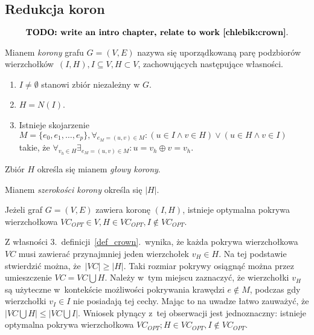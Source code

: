 \subsection{Redukcja koron}\label{ss_kernelization_crown_reduction}
\par{
  \[\textbf{TODO: write an intro chapter, relate to work~\cite{chlebik:crown}}.\]
}
\begin{definition}
  Mianem \emph{korony} grafu $G=(V, E)$ nazywa się uporządkowaną parę
  podzbiorów wierzchołków $(I, H), I \subseteq V, H \subset V$, zachowujących
  następujące własności.
  \begin{enumerate}
    \item $I \neq \emptyset$ stanowi zbiór niezależny w $G$.
    \item $H=N(I)$.
    \item Istnieje skojarzenie $M=\{e_0, e_1, \ldots, e_p\}, \forall_{e_M=(u,v) \in
      M}: (u\in I \land v\in H) \lor (u \in H \land v \in I)$ takie, że
      $\forall_{v_h \in H}\exists_{e_M=(u,v)\in M}: u = v_h \oplus v = v_h$.
  \end{enumerate}
\end{definition}
\begin{definition}
  Zbiór $H$ określa się mianem \emph{głowy korony}.
\end{definition}
\begin{definition}
  Mianem \emph{szerokości korony} określa się $|H|$.
\end{definition}
\begin{theorem}
  Jeżeli graf $G=(V,E)$ zawiera koronę $(I,H)$, istnieje optymalna pokrywa 
  wierzchołkowa $VC_{OPT} \in V, H \in VC_{OPT}, I \notin VC_{OPT}$.
\end{theorem}
\begin{bproof}
  Z własności 3.\ definicji~\ref{def_crown}.\ wynika, że każda pokrywa 
  wierzchołkowa $VC$ musi zawierać przynajmniej jeden wierzchołek $v_H \in H$.
  Na tej podstawie stwierdzić można, że $|VC|\geq|H|$.
  Taki rozmiar pokrywy osiągnąć można przez umieszczenie $VC=VC\bigcup H$.
  Należy w~tym miejscu zaznaczyć, że wierzchołki $v_H$ są użyteczne w~kontekście
  możliwości pokrywania krawędzi $e \notin M$, podczas gdy wierzchołki $v_I \in
  I$ nie posiadają tej cechy.
  Mając to na uwadze łatwo zauważyć, że $|VC \bigcup H| \leq |VC \bigcup
  I|$.
  Wniosek płynący z~tej obserwacji jest jednoznaczny: istnieje optymalna pokrywa
  wierzchołkowa $VC_{OPT}; H \in VC_{OPT}, I \notin VC_{OPT}$.
\end{bproof}

